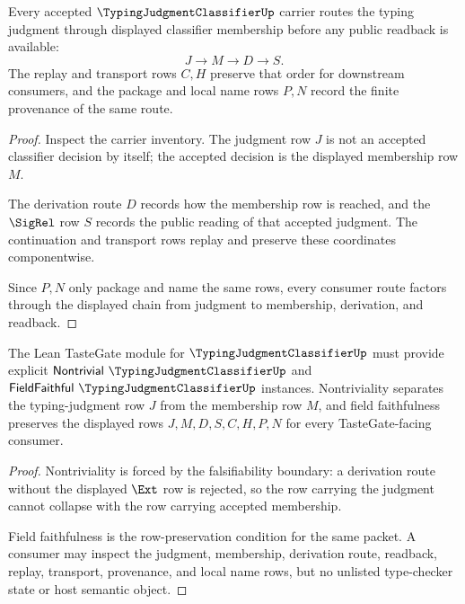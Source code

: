 \begin{theorem}
\label{thm:typing-judgment-classifier-derivation-route}
Every accepted $\TypingJudgmentClassifierUp$ carrier routes the typing judgment through displayed classifier membership before any public readback is available:
$$
J \to M \to D \to S.
$$
The replay and transport rows $C,H$ preserve that order for downstream consumers, and the package and local name rows $P,N$ record the finite provenance of the same route.
\end{theorem}
\begin{proof}
Inspect the carrier inventory. The judgment row $J$ is not an accepted classifier decision by itself; the accepted decision is the displayed membership row $M$.

The derivation route $D$ records how the membership row is reached, and the $\SigRel$ row $S$ records the public reading of that accepted judgment. The continuation and transport rows replay and preserve these coordinates componentwise.

Since $P,N$ only package and name the same rows, every consumer route factors through the displayed chain from judgment to membership, derivation, and readback.
\end{proof}

\begin{theorem}
\label{thm:typing-judgment-classifier-tastegate-readiness}
The Lean TasteGate module for $\TypingJudgmentClassifierUp$ must provide explicit $\mathsf{Nontrivial}\ \TypingJudgmentClassifierUp$ and $\mathsf{FieldFaithful}\ \TypingJudgmentClassifierUp$ instances. Nontriviality separates the typing-judgment row $J$ from the membership row $M$, and field faithfulness preserves the displayed rows $J,M,D,S,C,H,P,N$ for every TasteGate-facing consumer.
\end{theorem}
\begin{proof}
Nontriviality is forced by the falsifiability boundary: a derivation route without the displayed $\Ext$ row is rejected, so the row carrying the judgment cannot collapse with the row carrying accepted membership.

Field faithfulness is the row-preservation condition for the same packet. A consumer may inspect the judgment, membership, derivation route, readback, replay, transport, provenance, and local name rows, but no unlisted type-checker state or host semantic object.
\end{proof}

